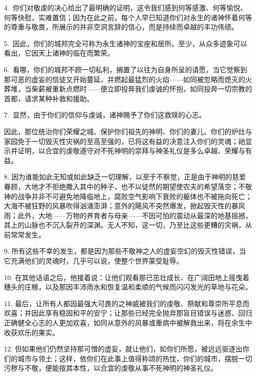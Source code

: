 4.\ 你们对敬虔的决心给出了最明确的证明，这令我们感到何等感激、何等愉悦、何等快慰，实难置信；因为在此之前，每个人早已知道你们对永生的诸神怀着何等的尊重与敬畏，所展示的并非空洞言辞的信心，而是持续而卓越的丰功伟绩。\par

5.\ 因此，你们的城邦完全可称为永生诸神的宝座和居所。至少，从众多迹象可以看出，它因天上诸神的临在而繁荣。\par

6.\ 看哪，你们的城邦不顾一切私利，搁置了以往为自身所呈的请愿，当它觉察到那可恶的虚妄的信徒又开始蔓延，并燃起最猛烈的火焰——如同被忽略而熄灭的火葬堆，当柴薪被重新点燃时——便立即投奔我们虔诚的怀抱，如同投奔一切宗教的首都，请求某种补救和援助。\par

7.\ 显然，由于你们的信仰与虔诚，诸神赐予了你们这救赎的心志。\par

因此，那位统治你们荣耀之城、保护你们祖先的神明、你们的妻儿、你们的炉灶与家园免于一切毁灭性灾祸的至高至强的，已将这有益的决意注入你们的灵魂；祂显示并证明，以合宜的虔敬遵守对不死神明的崇拜与神圣礼仪是多么卓越、荣耀与有益。\par

8. 因为谁能如此无知或如此缺乏一切理解，以至于不察觉，正是由于神明的慈爱眷顾，大地才不拒绝撒入其中的种子，也不以徒然的期望使农夫的希望落空；不敬神的战争并非不可避免地降临地上，腐败空气影响下衰败的躯体也不被拖向死亡；大海不被狂野的风暴吹得汹涌澎湃；意外的飓风不突然爆发，掀起毁灭性的暴风雨；此外，大地——万物的养育者与母亲——不因可怕的震动从最深的地基摇撼，其上的山脉也不沉入裂开的深渊。无人不知，这一切，乃至比这些更糟的灾祸，从前常常发生。\par

9. 所有这些不幸的发生，都是因为那些不敬神之人的虚妄空幻的毁灭性错误，当它充满他们的灵魂时，几乎可以说，使整个世界蒙受耻辱。\par

10. 在其他话语之后，他接着说：让他们观看那已茁壮成长、在广阔田地上摇曳着穗头的庄稼，以及那因丰沛雨水和恢复温和柔顺的气候而闪闪发光的草地与花朵。\par

11. 最后，让所有人都因最强大可畏的之神威被我们的虔敬、祭献和尊崇所平息而欢喜；并因此享有稳固和平的安宁；让那些已经完全抛弃那盲目错误与迷惑、回归正确健全心志的人更加欢喜，如同从意外的风暴或重病中被解救出来，将在余生中收获欢乐的果实。\par

12. 但如果他们仍然坚持那可憎的虚妄，就让他们，如你们所愿，被远远驱逐出你们的城市与领土；这样，依你们在此事上值得称颂的热忱，你们的城市，摆脱一切污秽与不敬，便能按其本性，以合宜的虔敬从事不死神明的神圣礼仪。\par


